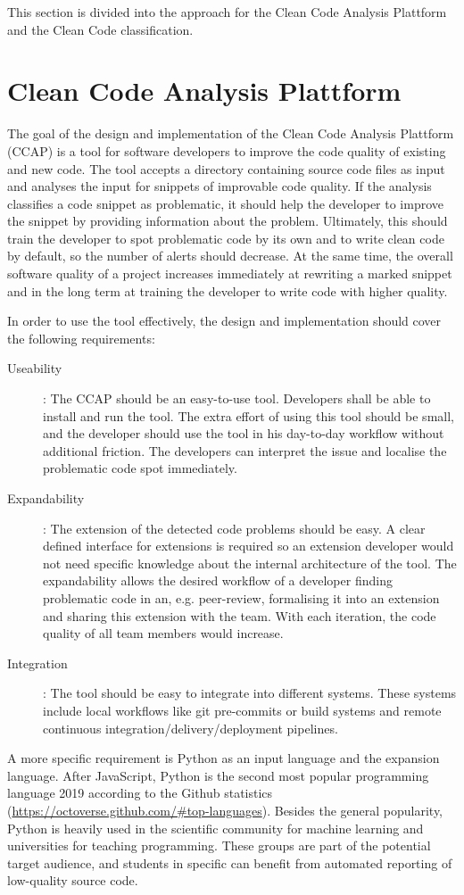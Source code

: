 This section is divided into the approach for the Clean Code Analysis Plattform and the Clean Code classification.

\chapter{Clean Code Analysis Plattform}
The goal of the design and implementation of the Clean Code Analysis Plattform (CCAP) is a tool for software developers to improve the code quality of existing and new code. The tool accepts a directory containing source code files as input and analyses the input for snippets of improvable code quality. If the analysis classifies a code snippet as problematic, it should help the developer to improve the snippet by providing information about the problem. Ultimately, this should train the developer to spot problematic code by its own and to write clean code by default, so the number of alerts should decrease. At the same time, the overall software quality of a project increases immediately at rewriting a marked snippet and in the long term at training the developer to write code with higher quality.

In order to use the tool effectively, the design and implementation should cover the following requirements:
\begin{description}
    \item[Useability]:  The CCAP should be an easy-to-use tool. Developers shall be able to install and run the tool. The extra effort of using this tool should be small, and the developer should use the tool in his day-to-day workflow without additional friction. The developers can interpret the issue and localise the problematic code spot immediately.
    \item[Expandability]: The extension of the detected code problems should be easy. A clear defined interface for extensions is required so an extension developer would not need specific knowledge about the internal architecture of the tool. The expandability allows the desired workflow of a developer finding problematic code in an, e.g. peer-review, formalising it into an extension and sharing this extension with the team. With each iteration, the code quality of all team members would increase.
    \item[Integration]: The tool should be easy to integrate into different systems. These systems include local workflows like git pre-commits or build systems and remote continuous integration/delivery/deployment pipelines.
\end{description}
A more specific requirement is Python as an input language and the expansion language. After JavaScript, Python is the second most popular programming language 2019 according to the Github statistics (\url{https://octoverse.github.com/#top-languages}). Besides the general popularity, Python is heavily used in the scientific community for machine learning and universities for teaching programming. These groups are part of the potential target audience, and students in specific can benefit from automated reporting of low-quality source code.


